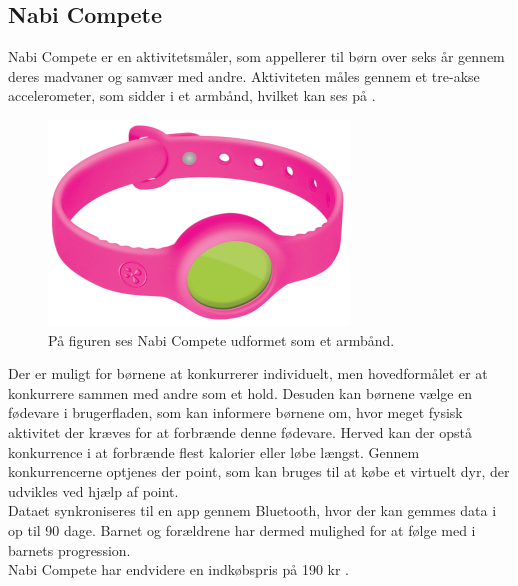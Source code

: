 \subsection{Nabi Compete}
Nabi Compete er en aktivitetsmåler, som appellerer til børn over seks år gennem deres madvaner og samvær med andre. Aktiviteten måles gennem et tre-akse accelerometer, som sidder i et armbånd, hvilket kan ses på .
\begin{figure}[H]
	\centering
	\includegraphics[scale=0.6]{figures/aProblemanalyse/nabi.png}
	\caption{På figuren ses Nabi Compete udformet som et armbånd. \citep{Perez2015}}
	\label{fig:nabi}
\end{figure}\vspace{-.25cm}
Der er muligt for børnene at konkurrerer individuelt, men hovedformålet er at konkurrere sammen med andre som et hold. Desuden kan børnene vælge en fødevare i brugerfladen, som kan informere børnene om, hvor meget fysisk aktivitet der kræves for at forbrænde denne fødevare. Herved kan der opstå konkurrence i at forbrænde flest kalorier eller løbe længst. Gennem konkurrencerne optjenes der point, som kan bruges til at købe et virtuelt dyr, der udvikles ved hjælp af point. \\
Dataet synkroniseres til en app gennem Bluetooth, hvor der kan gemmes data i op til 90 dage. Barnet og forældrene har dermed mulighed for at følge med i barnets progression. \\
Nabi Compete har endvidere en indkøbspris på 190 kr \citep{Fuhu2015,Fuhu_tech2015}.


